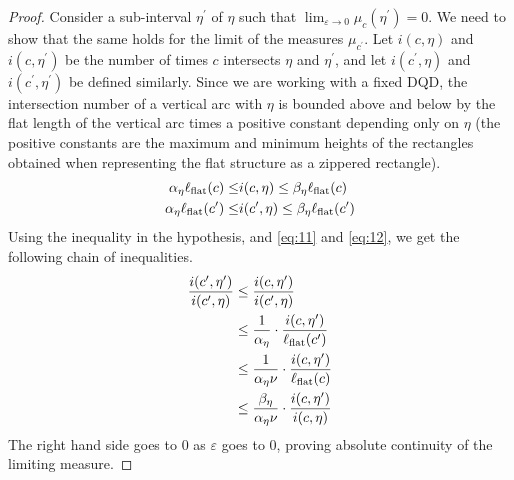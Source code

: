 \documentclass[12pt, reqno]{amsart}
\begin{document}
\begin{proof}
  Consider a sub-interval $\eta^{\prime}$ of $\eta$ such that $\lim_{\varepsilon \to 0}\mu_c(\eta^{\prime}) = 0$.
  We need to show that the same holds for the limit of the measures $\mu_{c^{\prime}}$.
  Let $i(c, \eta)$ and $i(c, \eta^{\prime})$ be the number of times $c$ intersects $\eta$ and $\eta^{\prime}$, and let $i(c^{\prime}, \eta)$ and $i(c^{\prime}, \eta^{\prime})$ be defined similarly.
  Since we are working with a fixed DQD, the intersection number of a vertical arc with $\eta$ is bounded above and below by the flat length of the vertical arc times a positive constant depending only on $\eta$ (the positive constants are the maximum and minimum heights of the rectangles obtained when representing the flat structure as a zippered rectangle).
  \begin{align}
    \label{eq:11}
    \alpha_{\eta} \ell_{\mathrm{flat}}(c) \leq &i(c, \eta) \leq \beta_{\eta} \ell_{\mathrm{flat}}(c) \\
    \label{eq:12}
    \alpha_{\eta} \ell_{\mathrm{flat}}(c^{\prime}) \leq &i(c^{\prime}, \eta) \leq \beta_{\eta} \ell_{\mathrm{flat}}(c^{\prime})
  \end{align}
  Using the inequality in the hypothesis, and \eqref{eq:11} and \eqref{eq:12}, we get the following chain of inequalities.
  \begin{align*}
    \frac{i(c^{\prime}, \eta^{\prime})}{i(c^{\prime}, \eta)}
    &\leq \frac{i(c, \eta^{\prime})}{i(c^{\prime}, \eta)} \\
    &\leq \frac{1}{\alpha_{\eta}} \cdot \frac{i(c, \eta^{\prime})}{\ell_{\mathrm{flat}}(c^{\prime})} \\
    &\leq \frac{1}{\alpha_{\eta} \nu} \cdot \frac{i(c, \eta^{\prime})}{\ell_{\mathrm{flat}}(c)} \\
    &\leq \frac{\beta_{\eta}}{\alpha_{\eta} \nu} \cdot \frac{i(c, \eta^{\prime})}{i(c, \eta)}
  \end{align*}
  The right hand side goes to $0$ as $\varepsilon$ goes to $0$, proving absolute continuity of the limiting measure.
\end{proof}
\end{document}
